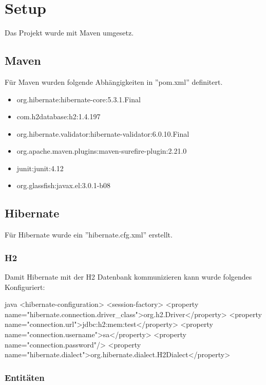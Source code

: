 	\section{Setup}
	
	Das Projekt wurde mit Maven umgesetz.
	
	\subsection{Maven}
	
	Für Maven wurden folgende Abhängigkeiten in  ''pom.xml'' definitert.
	
	\begin{itemize}
		\item org.hibernate:hibernate-core:5.3.1.Final
		\item com.h2database:h2:1.4.197
		\item org.hibernate.validator:hibernate-validator:6.0.10.Final
		\item org.apache.maven.plugins:maven-surefire-plugin:2.21.0
		\item junit:junit:4.12
		\item org.glassfish:javax.el:3.0.1-b08
	\end{itemize}

	\subsection{Hibernate}
	
	Für Hibernate wurde ein ''hibernate.cfg.xml'' erstellt. 
	
	\subsubsection{H2}
	
	Damit Hibernate mit der H2 Datenbank kommunizieren kann wurde folgendes Konfiguriert:
	
	\begin{code}[]{java}
		<hibernate-configuration>
		<session-factory>
		<property name="hibernate.connection.driver_class">org.h2.Driver</property>
		<property name="connection.url">jdbc:h2:mem:test</property>
		<property name="connection.username">sa</property>
		<property name="connection.password"/>
		<property name="hibernate.dialect">org.hibernate.dialect.H2Dialect</property>
	\end{code}
	
	\subsubsection{Entitäten}
	

